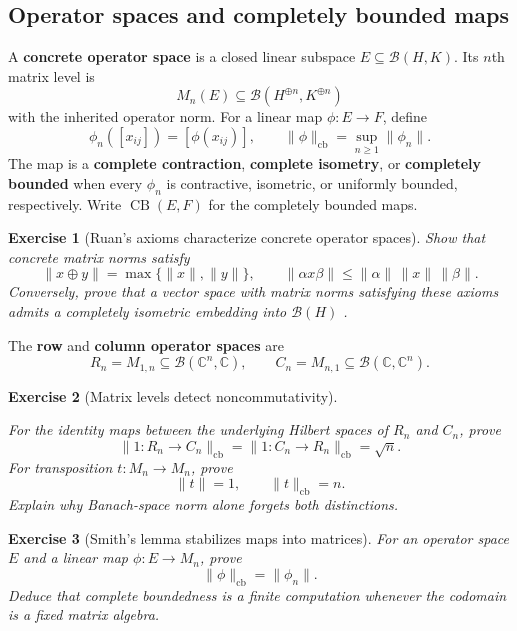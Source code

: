 \documentclass{article}
\newtheorem{exercise}{Exercise}
\begin{document}
\subsection{Operator spaces and completely bounded maps}

A \textbf{concrete operator space} is a closed linear subspace
$E\subseteq\mathcal B(H,K)$. Its $n$th matrix level is
\[
M_n(E)\subseteq\mathcal B(H^{\oplus n},K^{\oplus n})
\]
with the inherited operator norm. For a linear map $\phi:E\to F$, define
\[
\phi_n([x_{ij}])=[\phi(x_{ij})],
\qquad
\|\phi\|_{\mathrm{cb}}=\sup_{n\geq1}\|\phi_n\|.
\]
The map is a \textbf{complete contraction}, \textbf{complete isometry}, or
\textbf{completely bounded} when every $\phi_n$ is contractive, isometric, or
uniformly bounded, respectively. Write $\operatorname{CB}(E,F)$ for the
completely bounded maps.

\begin{exercise}[Ruan's axioms characterize concrete operator spaces]
\leavevmode\par
\textit{Show that concrete matrix norms satisfy}
\[
\|x\oplus y\|=\max\{\|x\|,\|y\|\},
\qquad
\|\alpha x\beta\|\leq\|\alpha\|\,\|x\|\,\|\beta\|.
\]
\textit{Conversely, prove that a vector space with matrix norms satisfying
these axioms admits a completely isometric embedding into
$\mathcal B(H)$ \cite{ruan-operator-spaces}.}
\end{exercise}

The \textbf{row} and \textbf{column operator spaces} are
\[
R_n=M_{1,n}\subseteq\mathcal B(\mathbb C^n,\mathbb C),
\qquad
C_n=M_{n,1}\subseteq\mathcal B(\mathbb C,\mathbb C^n).
\]

\begin{exercise}[Matrix levels detect noncommutativity]
\label{ex:row-column}\leavevmode\par
\textit{For the identity maps between the underlying Hilbert spaces of
$R_n$ and $C_n$, prove}
\[
\|1:R_n\to C_n\|_{\mathrm{cb}}
=\|1:C_n\to R_n\|_{\mathrm{cb}}=\sqrt n.
\]
\textit{For transposition $t:M_n\to M_n$, prove}
\[
\|t\|=1,
\qquad
\|t\|_{\mathrm{cb}}=n.
\]
\textit{Explain why Banach-space norm alone forgets both distinctions.}
\end{exercise}

\begin{exercise}[Smith's lemma stabilizes maps into matrices]\leavevmode\par
\textit{For an operator space $E$ and a linear map $\phi:E\to M_n$, prove}
\cite{smith-cb}
\[
\|\phi\|_{\mathrm{cb}}=\|\phi_n\|.
\]
\textit{Deduce that complete boundedness is a finite computation whenever the
codomain is a fixed matrix algebra.}
\end{exercise}
\end{document}
